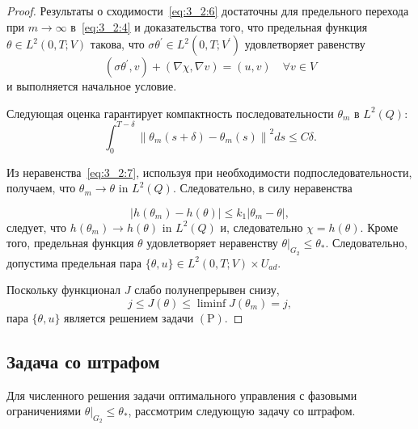 \begin{proof}
    Результаты о сходимости~\eqref{eq:3_2:6} достаточны для предельного перехода
    при $m \rightarrow \infty$ в~\eqref{eq:3_2:4} и доказательства того,
    что предельная функция $\theta \in L^{2}(0, T ; V) $ такова,
    что $\sigma \theta^{\prime} \in L^{2}\left(0, T ; V^{\prime}\right)$
    удовлетворяет равенству
    \[ \left(\sigma \theta^{\prime}, v\right)+(\nabla \chi, \nabla v)=(u, v) \quad \forall v \in V \]
    и выполняется начальное условие.

    Следующая оценка гарантирует компактность последовательности $\theta_{m}$ в $L^{2}(Q)$:
    \begin{equation}
        \label{eq:3_2:7}
        \int_{0}^{T-\delta}\left\|\theta_{m}(s+\delta)-\theta_{m}(s)\right\|^{2} d s \leq C \delta.
    \end{equation}

    Из неравенства~\eqref{eq:3_2:7}, используя при необходимости подпоследовательности,
    получаем, что $\theta_{m} \rightarrow \theta$ in $L^{2}(Q)$.
    Следовательно, в силу неравенства

    \[
        \left|h\left(\theta_{m}\right)-h(\theta)\right|
        \leq k_{1}\left|\theta_{m}-\theta\right|,
    \]
    следует, что $h\left(\theta_{m}\right) \rightarrow h(\theta)$ in $L^{2}(Q)$
    и, следовательно $\chi=h(\theta)$.
    Кроме того, предельная функция $\theta$ удовлетворяет неравенству
    $\left.\theta\right|_{G_{2}} \leq \theta_{*}$.
    Следовательно, допустима предельная пара
    $\{\theta, u\} \in L^{2}(0, T ; V) \times U_{a d}$.


    Поскольку функционал $J$ слабо полунепрерывен снизу,
    \[ j \leq J(\theta) \leq \liminf J\left(\theta_{m}\right)=j, \]
    пара $\{\theta, u\}$ является решением задачи $(\mathrm{P})$.
\end{proof}

\subsection{Задача со штрафом}
\label{subsec:ch3/sec2/penalty}
Для численного решения задачи оптимального управления с фазовыми ограничениями
$\left.\theta\right|_{G_{2}} \leq \theta_{*}$, рассмотрим следующую задачу со штрафом.

